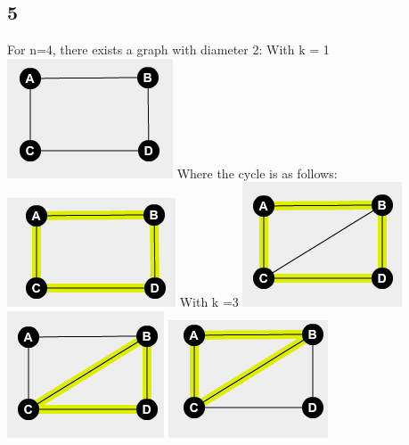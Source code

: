 \documentclass{article}
\begin{document}
	\subsection*{5}
	For n=4, there exists a graph with diameter 2:
	\newline
	With k = 1
	\newline
	\includegraphics{4None2}
	\newline
	Where the cycle is as follows:
	\newline
	\includegraphics{41Cycle1}
	\newline
	With k =3
	\newline
	\includegraphics{43Cycles1}
	\includegraphics{43Cycles2}
	\includegraphics{43Cycles3}
\end{document}
